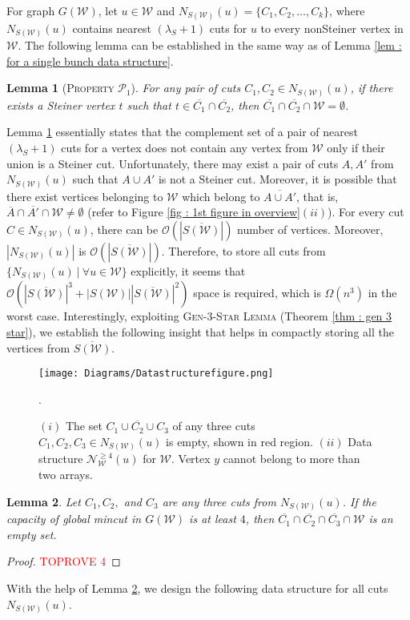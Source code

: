 \documentclass[letterpaper,11pt]{article}
\newtheorem{lemma}{Lemma}[]
\begin{document}
For graph $G({\mathcal W})$, let $u\in {\mathcal W}$ and $N_{S({\mathcal W})}(u)=\{C_1,C_2,\ldots,C_k\}$, where $N_{S({\mathcal W})}(u)$ contains nearest $(\lambda_S+1)$ cuts for $u$ to every nonSteiner vertex in ${\mathcal W}$. 
The following lemma can be established in the same way as of Lemma \ref{lem : for a single bunch data structure}. \begin{lemma} [\textsc{Property ${\mathcal P}_1$}] \label{lem : pair of bunches}
   For any pair of cuts $C_1,C_2\in N_{S({\mathcal W})}(u)$, if there exists a Steiner vertex $t$ such that $t\in \overline{C_1}\cap \overline{C_2}$, then $\overline{C_1}\cap \overline{C_2}\cap {\mathcal W}=\emptyset$.  
\end{lemma}
Lemma \ref{lem : pair of bunches} essentially states that the complement set of a pair of nearest $(\lambda_S+1)$ cuts for a vertex does not contain any vertex from ${\mathcal W}$ only if their union is a Steiner cut. Unfortunately, there may exist a pair of cuts $A,A'$ from $N_{S({\mathcal W})}(u)$ such that $A\cup A'$ is not a Steiner cut. Moreover, it is possible that there exist vertices belonging to ${\mathcal W}$ which belong to $\overline{A\cup A'}$, that is, $\overline{A}\cap \overline{A'}\cap {\mathcal W}\ne \emptyset$ (refer to Figure \ref{fig : 1st figure in overview}$(ii)$). 
For every cut $C\in N_{S({\mathcal W})}(u)$, there can be ${\mathcal O}(|\overline{S({\mathcal W})}|)$ number of vertices. Moreover, $|N_{S({\mathcal W})}(u)|$ is ${\mathcal O}(|\overline{S({\mathcal W})}|)$. Therefore, to store all cuts from $\{N_{S({\mathcal W})}(u)~|~\forall u\in {\mathcal W}\}$ explicitly, it seems that ${\mathcal O}(|\overline{S({\mathcal W})}|^3+|S({\mathcal W})||\overline{S({\mathcal W})}|^2)$ space is required, which is $\Omega(n^3)$ in the worst case. Interestingly, exploiting \textsc{Gen-3-Star Lemma} (Theorem \ref{thm : gen 3 star}), we establish the following insight that helps in compactly storing all the vertices from $\overline{S({\mathcal W})}$. \begin{figure}
 \centering
    \texttt{[image: Diagrams/Datastructurefigure.png]} 
   \caption{$(i)$ The set $\overline{C_1\cup C_2\cup C_3}$
   of any three cuts $C_1,C_2,C_3\in N_{S({\mathcal W})}(u)$ is empty, shown in red region. $(ii)$ Data structure ${\mathcal N}_{{\mathcal W}}^{\ge 4}(u)$ for ${\mathcal W}$. Vertex $y$ cannot belong to more than two arrays.}
  \label{fig : data structure}. 
\end{figure}
\begin{lemma} \label{lem : three sets are nonempty}
    Let $C_1,C_2,$ and $C_3$ are any three cuts from $N_{S({\mathcal W})}(u)$. If the capacity of global mincut in $G({\mathcal W})$ is at least $4$, then $\overline{C_1}\cap \overline{C_2} \cap \overline{C_3}\cap {\mathcal W}$ is an empty set. 
\end{lemma}
\begin{proof}\textcolor{red}{TOPROVE 4}\end{proof}
With the help of Lemma \ref{lem : three sets are nonempty}, we design the following data structure for all cuts $N_{S({\mathcal W})}(u)$.
\end{document}
